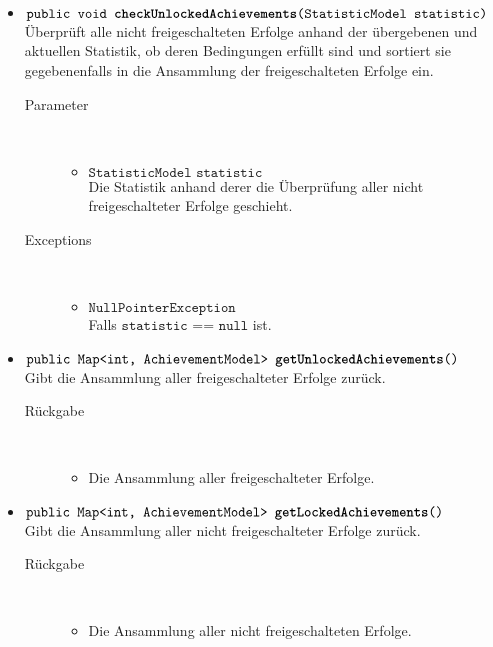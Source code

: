 \begin{description}
\begin{itemize}
				\item $\texttt{public void \textbf{checkUnlockedAchievements}(StatisticModel statistic)}$ \\ Überprüft alle nicht freigeschalteten Erfolge anhand der übergebenen und aktuellen Statistik, ob deren Bedingungen erfüllt sind und sortiert sie gegebenenfalls in die Ansammlung  der freigeschalteten Erfolge ein.
				\begin{description}
				\item[Parameter] \hfill \\
					\vspace{-.8cm}
					\begin{itemize}
						\item $\texttt{StatisticModel statistic}$ \\ Die Statistik anhand derer die Überprüfung aller nicht freigeschalteter Erfolge geschieht. 
					\end{itemize}
					\item[Exceptions] \hfill \\
					\vspace{-.8cm}
					\begin{itemize}
						\item $\texttt{NullPointerException}$ \\ Falls $\texttt{statistic == null}$ ist.
					\end{itemize}
				\end{description}	
				
				\item $\texttt{public Map<int, AchievementModel> \textbf{getUnlockedAchievements}()}$ \\ Gibt die Ansammlung aller freigeschalteter Erfolge zurück.
				\begin{description}
					\item[Rückgabe] \hfill \\
					\vspace{-.8cm}
					\begin{itemize}
						\item Die Ansammlung aller freigeschalteter Erfolge.
					\end{itemize}
				\end{description}
				
				\item $\texttt{public Map<int, AchievementModel> \textbf{getLockedAchievements}()}$ \\ Gibt die Ansammlung aller nicht freigeschalteter Erfolge zurück.
				\begin{description}
					\item[Rückgabe] \hfill \\
					\vspace{-.8cm}
					\begin{itemize}
						\item Die Ansammlung aller nicht freigeschalteten Erfolge.
					\end{itemize}
				\end{description}
				

\end{itemize}
\end{description}
